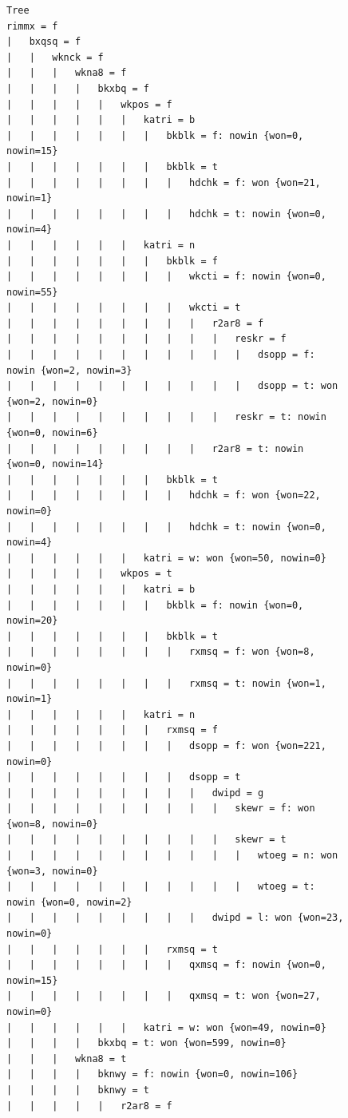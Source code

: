 \documentclass[11pt]{article}
\begin{document}
\begin{figure}[!ht]
	\centering
\tiny\begin{verbatim}
Tree
rimmx = f
|   bxqsq = f
|   |   wknck = f
|   |   |   wkna8 = f
|   |   |   |   bkxbq = f
|   |   |   |   |   wkpos = f
|   |   |   |   |   |   katri = b
|   |   |   |   |   |   |   bkblk = f: nowin {won=0, nowin=15}
|   |   |   |   |   |   |   bkblk = t
|   |   |   |   |   |   |   |   hdchk = f: won {won=21, nowin=1}
|   |   |   |   |   |   |   |   hdchk = t: nowin {won=0, nowin=4}
|   |   |   |   |   |   katri = n
|   |   |   |   |   |   |   bkblk = f
|   |   |   |   |   |   |   |   wkcti = f: nowin {won=0, nowin=55}
|   |   |   |   |   |   |   |   wkcti = t
|   |   |   |   |   |   |   |   |   r2ar8 = f
|   |   |   |   |   |   |   |   |   |   reskr = f
|   |   |   |   |   |   |   |   |   |   |   dsopp = f: nowin {won=2, nowin=3}
|   |   |   |   |   |   |   |   |   |   |   dsopp = t: won {won=2, nowin=0}
|   |   |   |   |   |   |   |   |   |   reskr = t: nowin {won=0, nowin=6}
|   |   |   |   |   |   |   |   |   r2ar8 = t: nowin {won=0, nowin=14}
|   |   |   |   |   |   |   bkblk = t
|   |   |   |   |   |   |   |   hdchk = f: won {won=22, nowin=0}
|   |   |   |   |   |   |   |   hdchk = t: nowin {won=0, nowin=4}
|   |   |   |   |   |   katri = w: won {won=50, nowin=0}
|   |   |   |   |   wkpos = t
|   |   |   |   |   |   katri = b
|   |   |   |   |   |   |   bkblk = f: nowin {won=0, nowin=20}
|   |   |   |   |   |   |   bkblk = t
|   |   |   |   |   |   |   |   rxmsq = f: won {won=8, nowin=0}
|   |   |   |   |   |   |   |   rxmsq = t: nowin {won=1, nowin=1}
|   |   |   |   |   |   katri = n
|   |   |   |   |   |   |   rxmsq = f
|   |   |   |   |   |   |   |   dsopp = f: won {won=221, nowin=0}
|   |   |   |   |   |   |   |   dsopp = t
|   |   |   |   |   |   |   |   |   dwipd = g
|   |   |   |   |   |   |   |   |   |   skewr = f: won {won=8, nowin=0}
|   |   |   |   |   |   |   |   |   |   skewr = t
|   |   |   |   |   |   |   |   |   |   |   wtoeg = n: won {won=3, nowin=0}
|   |   |   |   |   |   |   |   |   |   |   wtoeg = t: nowin {won=0, nowin=2}
|   |   |   |   |   |   |   |   |   dwipd = l: won {won=23, nowin=0}
|   |   |   |   |   |   |   rxmsq = t
|   |   |   |   |   |   |   |   qxmsq = f: nowin {won=0, nowin=15}
|   |   |   |   |   |   |   |   qxmsq = t: won {won=27, nowin=0}
|   |   |   |   |   |   katri = w: won {won=49, nowin=0}
|   |   |   |   bkxbq = t: won {won=599, nowin=0}
|   |   |   wkna8 = t
|   |   |   |   bknwy = f: nowin {won=0, nowin=106}
|   |   |   |   bknwy = t
|   |   |   |   |   r2ar8 = f

\end{verbatim}
\end{figure}
\end{document}
